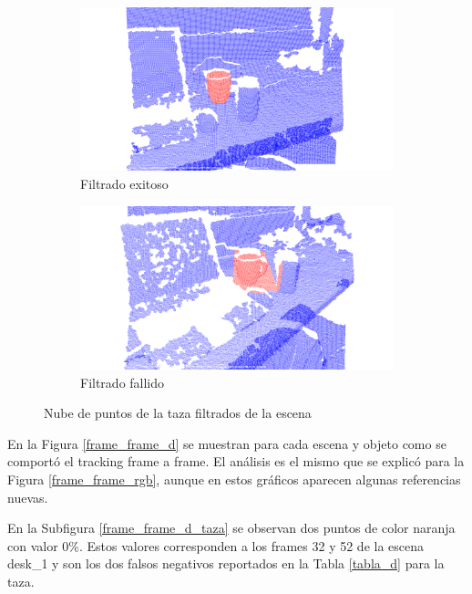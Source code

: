 \begin{figure}
	\centering
	\begin{subfigure}[b]{0.9\textwidth}
		\includegraphics[width=\textwidth]{img/taza_filtrado_exitoso_definitivo_depth_frame12.png}
		\caption{Filtrado exitoso}
		\label{filtro_en_deteccion_bien}
	\end{subfigure}
	\quad
	\begin{subfigure}[b]{0.9\textwidth}
		\includegraphics[width=\textwidth]{img/taza_filtrado_fallido_depth_simil_thresh_01_frame66.png}
		\caption{Filtrado fallido}
		\label{filtro_en_deteccion_mal}
	\end{subfigure}
	\caption{Nube de puntos de la taza filtrados de la escena}
	\label{filtro_en_deteccion}
\end{figure}

En la Figura \ref{frame_frame_d} se muestran para cada escena y objeto como se comportó el tracking frame a frame. El análisis es el mismo que se explicó para la Figura \ref{frame_frame_rgb}, aunque en estos gráficos aparecen algunas referencias nuevas.

En la Subfigura \ref{frame_frame_d_taza} se observan dos puntos de color naranja con valor 0\%. Estos valores corresponden a los frames 32 y 52 de la escena desk\_1 y son los dos falsos negativos reportados en la Tabla \ref{tabla_d} para la taza.

